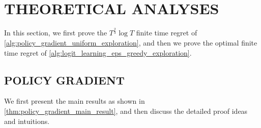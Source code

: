 \section{THEORETICAL ANALYSES}
\label{sec:theoretical_analyses}

In this section, we first prove the $T^{\frac{2}{3}}\log{T}$ finite time regret of \cref{alg:policy_gradient_uniform_exploration}, and then we prove the optimal finite time regret of \cref{alg:logit_learning_eps_greedy_exploration}.

\subsection{POLICY GRADIENT}
\label{subsec:theoretical_analyses_policy_gradient}

We first present the main results as shown in \cref{thm:policy_gradient_main_result}, and then discuss the detailed proof ideas and intuitions.

